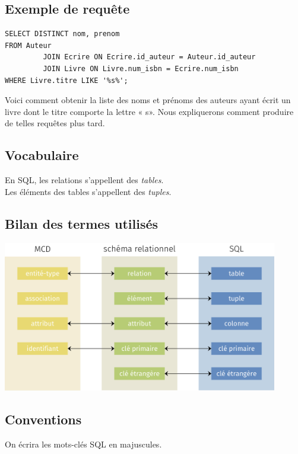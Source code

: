 \subsection{Exemple de requête}

\footnotesize

\begin{sql}
    \begin{verbatim}
SELECT DISTINCT nom, prenom
FROM Auteur
         JOIN Ecrire ON Ecrire.id_auteur = Auteur.id_auteur
         JOIN Livre ON Livre.num_isbn = Ecrire.num_isbn
WHERE Livre.titre LIKE '%s%';
\end{verbatim}
\end{sql}

\normalsize
Voici comment obtenir la liste des noms et prénoms des auteurs ayant écrit un livre dont le titre comporte la lettre « s». Nous expliquerons comment produire de telles requêtes plus tard.

\subsection{Vocabulaire}
En SQL, les relations s'appellent des \textit{tables}.\\

Les éléments des tables s'appellent des \textit{tuples}.

\subsection{Bilan des termes utilisés}
\begin{center}
    \includegraphics[width=12cm]{img/classification}
\end{center}

\subsection{Conventions}
On écrira les mots-clés SQL en majuscules.\\

